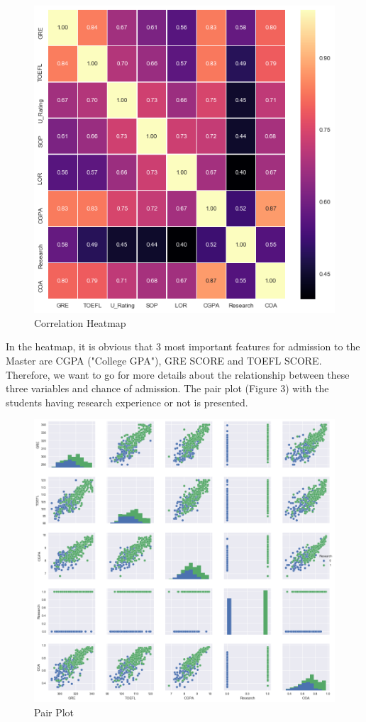 \documentclass[12pt]{article}
\begin{document}
\begin{sloppypar}
\begin{figure}[H]
    \centering
    \includegraphics[scale = 0.8]{corr_heatmap.png}
    \caption{Correlation Heatmap }
\end{figure}
In the heatmap, it is obvious that 3 most important features for admission to the Master are CGPA ("College GPA"), GRE SCORE and TOEFL SCORE. Therefore, we want to go for more details about the relationship between these three variables and chance of admission. The pair plot (Figure 3) with the students having research experience or not is presented.

\begin{figure}[H]
    \centering
    \includegraphics[scale = 0.46]{pair_plot.png}
    \caption{Pair Plot}
\end{figure}


\end{sloppypar}
\end{document}
